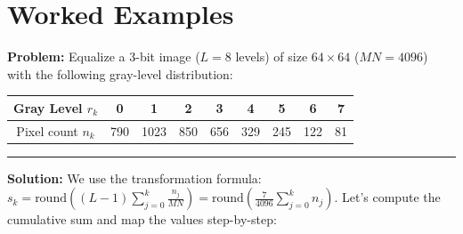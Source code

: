 \documentclass[12pt,a4paper]{article}
\renewcommand{\arraystretch}{1.45}
\begin{document}
\section{Worked Examples}

\begin{tcolorbox}[examplebox, title={Discrete Histogram Equalization}]
\textbf{Problem:} Equalize a 3-bit image ($L=8$ levels) of size $64 \times 64$ ($MN = 4096$) with the following gray-level distribution:
\begin{center}
  \small
  {\renewcommand{\arraystretch}{1.65}%
\begin{tabular}{|c|c|c|c|c|c|c|c|c|}
\hline
Gray Level $r_k$ & 0 & 1 & 2 & 3 & 4 & 5 & 6 & 7 \\[4pt]
\hline
Pixel count $n_k$ & 790 & 1023 & 850 & 656 & 329 & 245 & 122 & 81 \\[4pt]
\hline
\end{tabular}}
\end{center}

\par\noindent\rule{\linewidth}{0.5pt}\par
\textbf{Solution:}
We use the transformation formula: $s_k = \text{round}\left( (L-1) \sum_{j=0}^k \frac{n_j}{MN} \right) = \text{round}\left( \frac{7}{4096} \sum_{j=0}^k n_j \right)$.
Let's compute the cumulative sum and map the values step-by-step:


\end{tcolorbox}
\end{document}
